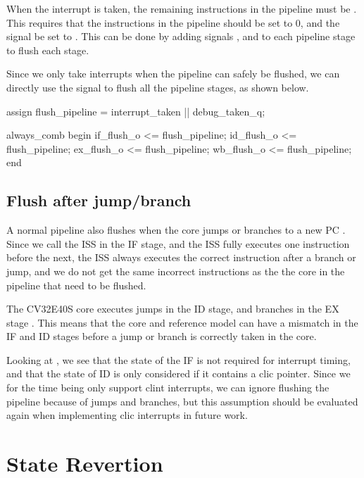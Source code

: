 When the interrupt is taken, the remaining instructions in the pipeline must be . This requires that the instructions in the pipeline should be set to 0, and the  signal be set to . This can be done by adding signals , and  to each pipeline stage to flush each stage.

Since we only take interrupts when the pipeline can safely be flushed, we can directly use the  signal to flush all the pipeline stages, as shown below.

\begin{systemverilog}
    assign flush_pipeline = interrupt_taken || debug_taken_q;

    always_comb begin
        if_flush_o <= flush_pipeline;
        id_flush_o <= flush_pipeline;
        ex_flush_o <= flush_pipeline;
        wb_flush_o <= flush_pipeline;
    end
\end{systemverilog}

\subsection{Flush after jump/branch}

A normal pipeline also flushes when the core jumps or branches to a new PC \cite{pattersonComputerOrganizationDesign2021}. Since we call the ISS in the IF stage, and the ISS fully executes one instruction before the next, the ISS always executes the correct instruction after a branch or jump, and we do not get the same incorrect instructions as the the core in the pipeline that need to be flushed.


The CV32E40S core executes jumps in the ID stage, and branches in the EX stage \cite{openhwgroupPipelineDetailsCOREV2023}. This means that the core and reference model can have a mismatch in the IF and ID stages before a jump or branch is correctly taken in the core.

Looking at , we see that the state of the IF is not required for interrupt timing, and that the state of ID is only considered if it contains a \acrshort{clic} pointer. Since we for the time being only support \acrshort{clint} interrupts, we can ignore flushing the pipeline because of jumps and branches, but this assumption should be evaluated again when implementing \acrshort{clic} interrupts in future work.

\section{State Revertion}
\label{sec:ps_revertion}

